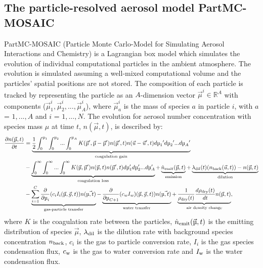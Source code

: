 \documentclass[edeposit,fullpage]{uiucthesis2009}
\begin{document}
\subsection{The particle-resolved aerosol model PartMC-MOSAIC}
PartMC-MOSAIC (Particle Monte Carlo-Model for Simulating Aerosol
Interactions and Chemistry) is a Lagrangian box model which simulates
the evolution of individual computational particles in the ambient
atmosphere. The evolution is simulated assuming a well-mixed
computational volume and the particles' spatial positions are not
stored. The composition of each particle is tracked by representing
the particle as an $A$-dimension vector $\vec{\mu}^i \in \mathbb{R}^A$
with components ($\vec{\mu}_1^i,\vec{\mu}_2^i,...,\vec{\mu}_A^i$),
where $\vec{\mu}_a^i$ is the mass of species $a$ in particle $i$, with
$a$ = $1,...,A$ and $i$ = $1,...,N$. The evolution for aerosol number
concentration with species mass $\mu$ at time $t$, $n(\vec{\mu},t)$, 
is described by:
\begin{equation}
\begin{aligned}
 \frac{\partial n(\vec{\mu},t)}{\partial t} &= \underbrace{\frac{1}{2}\int_0^{\mu_1}\int_0^{\mu_2}...\int_0^{\mu_A} K(\vec{\mu}',\vec{\mu}-\vec{\mu}')n(\vec{\mu}',t)n(\vec{u}-\vec{u}',t)d{\mu_1}'d{\mu_2}'...d{\mu_A}'}_\text{coagulation gain}\\
& - \underbrace{\int_0^\infty\int_0^\infty...\int_0^\infty K(\vec{\mu},\vec{\mu}')n(\vec{\mu},t)n(\vec{\mu}',t)d\mu_1'd\mu_2'...d\mu_A' }_\text{coagulation loss} + \underbrace{\dot{n}_{\rm emit}(\vec{\mu},t)}_\text{emission} + \underbrace{\lambda_{\rm dil}(t)(n_{\rm back}(\vec{u},t))-n(\vec{\mu},t)}_\text{dilution}\\
&-\underbrace{\sum_{i=1}^{C}\frac{\partial}{\partial\mu_i}(c_iI_i(\vec{\mu},\vec{g},t))n(\vec{\mu,t})}_\text{gas-particle transfer} - \underbrace{\frac{\partial}{\partial\mu_{C+1}}(c_wI_w)(\vec{\mu},\vec{g},t))n(\vec{\mu,t})}_\text{water transfer} + \underbrace{\frac{1}{\rho_{\rm dry}(t)}\frac{d\rho_{\rm dry}(t)}{dt}n(\vec{\mu},t)}_\text{air density change},
\end{aligned}
\label{eq:partmc}
\end{equation}
where $K$ is the coagulation rate between the particles, $\dot{n}_{\rm
  emit}(\vec{\mu},t)$ is the emitting distribution of species
$\vec{\mu}$, $\lambda_{\rm dil}$ is the dilution rate with background
species concentration $n_{\rm back}$, $c_i$ is the gas to particle
conversion rate, $I_i$ is the gas species condensation flux, $c_{\rm
  w}$ is the gas to water conversion rate and $I_{\rm w}$ is the water
condensation flux.
\end{document}
